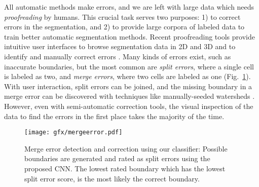 
All automatic methods make errors, and we are left with large data which needs \emph{proofreading} by humans. This crucial task serves two purposes: 1) to correct errors in the segmentation, and 2) to provide large corpora of labeled data to train better automatic segmentation methods. Recent proofreading tools provide intuitive user interfaces to browse segmentation data in 2D and 3D and to identify and manually correct errors \cite{markus_proofreading,raveler,mojo2,haehn_dojo_2014}. Many kinds of errors exist, such as inaccurate boundaries, but the most common are \emph{split errors}, where a single cell is labeled as two, and \emph{merge errors}, where two cells are labeled as one (Fig.~\ref{fig:merge_error}). With user interaction, split errors can be joined, and the missing boundary in a merge error can be discovered with techniques like manually-seeded watersheds \cite{haehn_dojo_2014}. However, even with semi-automatic correction tools, the visual inspection of the data to find the errors in the first place takes the majority of the time.

\begin{figure}[t]
\centering
\texttt{[image: gfx/mergeerror.pdf]}
\caption{ Merge error detection and correction using our classifier: Possible boundaries are generated and rated as split errors using the proposed CNN. The lowest rated boundary which has the lowest split error score, is the most likely the correct boundary.}
\label{fig:merge_error}
\end{figure}

